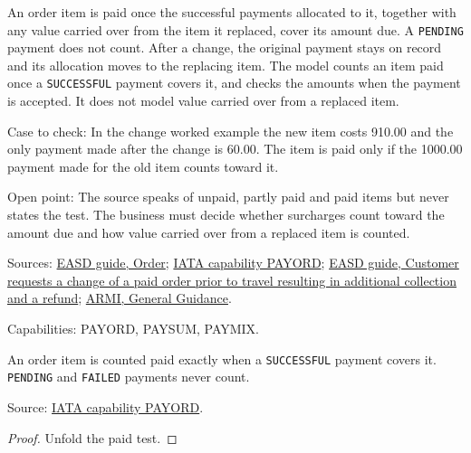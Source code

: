 \begin{definition}
  \label{def:payment-paid-order-item}
  An order item is paid once the successful payments allocated to it,
  together with any value carried over from the item it replaced, cover its
  amount due. A \texttt{PENDING} payment does not count. After a change, the
  original payment stays on record and its allocation moves to the replacing
  item.  The model counts an item paid once a \texttt{SUCCESSFUL} payment
  covers it, and checks the amounts when the payment is accepted.  It does
  not model value carried over from a replaced item.

  Case to check: In the change worked example the new item costs 910.00 and
  the only payment made after the change is 60.00. The item is paid only if
  the 1000.00 payment made for the old item counts toward it.

  Open point: The source speaks of unpaid, partly paid and paid items but
  never states the test. The business must decide whether surcharges count
  toward the amount due and how value carried over from a replaced item is
  counted.

  Sources: \href{https://standards.atlassian.net/wiki/spaces/EASD/pages/574849062/Order}{EASD guide, Order};
  \href{https://retailing.iata.org/armi/docs/PAYORD/}{IATA capability PAYORD};
  \href{https://standards.atlassian.net/wiki/spaces/EASD/pages/842301447/Customer+requests+a+change+of+a+paid+order+prior+to+travel+resulting+in+additional+collection+and+a+refund}{EASD guide, Customer requests a change of a paid order prior to travel resulting in additional collection and a refund};
  \href{https://standards.atlassian.net/wiki/spaces/ARMI/pages/584318980/General+Guidance}{ARMI, General Guidance}.

  Capabilities: PAYORD, PAYSUM, PAYMIX.
\end{definition}

\begin{theorem}
  \label{thm:payment-paid-iff}
  An order item is counted paid exactly when a \texttt{SUCCESSFUL} payment
  covers it.  \texttt{PENDING} and \texttt{FAILED} payments never count.

  Source: \href{https://retailing.iata.org/armi/docs/PAYORD/}{IATA capability PAYORD}.
\end{theorem}
\begin{proof}
  Unfold the paid test.
\end{proof}

